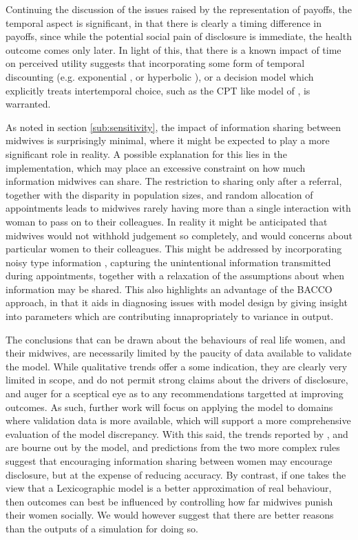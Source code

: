 Continuing the discussion of the issues raised by the representation of payoffs, the temporal aspect is significant, in that there is clearly a timing difference in payoffs, since while the potential social pain of disclosure is immediate, the health outcome comes only later. In light of this, that there is a known impact of time on perceived utility \citet{Thaler1981} suggests that incorporating some form of temporal discounting (e.g. exponential \citep{Samuelson1937}, or hyperbolic \citep{Ainslie1991}), or a decision model which explicitly treats intertemporal choice, such as the \ac{CPT} like model of \citet{Loewenstein1992}, is warranted. 

As noted in section \ref{sub:sensitivity}, the impact of information sharing between midwives is surprisingly minimal, where it might be expected to play a more significant role in reality. A possible explanation for this lies in the implementation, which may place an excessive constraint on how much information midwives can share. The restriction to sharing only after a referral, together with the disparity in population sizes, and random allocation of appointments leads to midwives rarely having more than a single interaction with woman to pass on to their colleagues. In reality it might be anticipated that midwives would not withhold judgement so completely, and would concerns about particular women to their colleagues. This might be addressed by incorporating noisy type information \citep{Feltovich2002}, capturing the unintentional information transmitted during appointments, together with a relaxation of the assumptions about when information may be shared.  This also highlights an advantage of the \ac{BACCO} approach, in that it aids in diagnosing issues with model design by giving insight into parameters which are contributing innapropriately to variance in output.

The conclusions that can be drawn about the behaviours of real life women, and their midwives, are necessarily limited by the paucity of data available to validate the model. While qualitative trends offer a some indication, they are clearly very limited in scope, and do not permit strong claims about the drivers of disclosure, and auger for a sceptical eye as to any recommendations targetted at improving outcomes.  As such, further work will focus on applying the model to domains where validation data is more available, which will support a more comprehensive evaluation of the model discrepancy. 
With this said, the trends reported by \citet{Alvik2006}, and \citet{Phillips2007} are bourne out by the model, and predictions from the two more complex rules suggest that encouraging information sharing between women may encourage disclosure, but at the expense of reducing accuracy. By contrast, if one takes the view that a Lexicographic model is a better approximation of real behaviour, then outcomes can best be influenced by controlling how far midwives punish their women socially. We would however suggest that there are better reasons than the outputs of a simulation for doing so.

